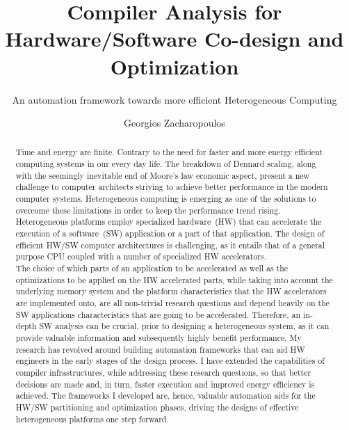 \documentclass[]{usiinfthesis}
\title{Compiler Analysis for Hardware/Software Co-design and Optimization}
\subtitle{ An automation framework towards more efficient Heterogeneous Computing} %
\author{Georgios Zacharopoulos} %
\newcommand{\HW}{{hardware}}
\newcommand{\SW}{{software}}
\begin{document}
\maketitle %

\frontmatter %

\begin{abstract}
Time and energy are finite. Contrary to the need for faster and more energy efficient computing 
systems in our every day life.
The breakdown of Dennard scaling, along with the seemingly inevitable end of 
Moore's law economic aspect, present a new challenge to computer architects striving to achieve
better performance in the modern computer systems. Heterogeneous computing is 
emerging as one of the solutions to overcome these limitations in order to keep the performance 
trend rising. 
Heterogeneous platforms employ 
specialized \HW\ (HW) that 
can accelerate the execution of a \SW\ (SW) application or a part of that application.
The design of efficient HW/SW computer architectures is challenging, as it entails that 
of a general purpose CPU coupled with a number of specialized HW accelerators.\\
The choice of which parts of an application to be accelerated as well as the 
optimizations to be applied on the HW accelerated parts, while taking into account the underlying 
memory system and the platform characteristics that the HW accelerators are implemented onto, are 
all non-trivial research questions and depend heavily on the SW applications characteristics that
are going to be accelerated. 
Therefore, an in-depth SW analysis can be crucial, prior to 
designing a heterogeneous system, as it can provide valuable information and subsequently 
highly benefit performance. 
My research has revolved around building automation frameworks that can aid HW engineers in the
early stages of the design process. I have extended the capabilities of compiler infrastructures,
while addressing these research questions, 
so that
better decisions are made and, in turn, faster execution and improved energy efficiency is achieved.
The frameworks I developed are, hence, valuable automation aids for the HW/SW partitioning and optimization 
phases, driving the designs of effective heterogeneous platforms one step forward.
\end{abstract}
\end{document}
